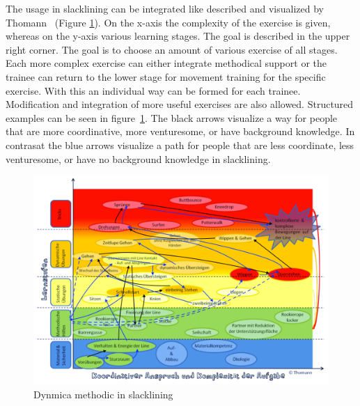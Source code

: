 The usage in slacklining can be integrated like described and visualized by Thomann~\cite{Thomann2013-aa} (Figure \ref{fig:3_3_1_dynamicDynamicSlackline}). On the x-axis the complexity of the exercise is given, whereas on the y-axis various learning stages. The goal is described in the upper right corner. The goal is to choose an amount of various exercise of all stages. Each more complex exercise can either integrate methodical support or the trainee can return to the lower stage for movement training for the specific exercise. With this an individual way can be formed for each trainee. Modification and integration of more useful exercises are also allowed. Structured examples can be seen in figure~\ref{fig:3_3_1_dynamicDynamicSlackline}. The black arrows visualize a way for people that are more coordinative, more venturesome, or have background knowledge. In contrasat the blue arrows visualize a path for people that are less coordinate, less venturesome, or have no background knowledge in slacklining.

\begin{figure}[htb]
	\centering
	\begin{minipage}[t]{1\linewidth}
		\centering
		\includegraphics[width=1\linewidth]{Pictures/3_3_1_dynamicDynamicSlackline2}
		\caption{Dynmica methodic in slacklining~\cite{Thomann2013-aa}}
		\label{fig:3_3_1_dynamicDynamicSlackline}
	\end{minipage}
\end{figure}

